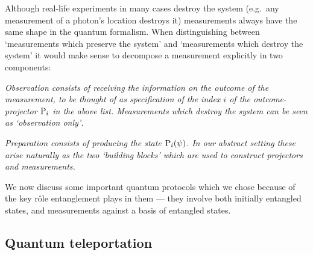 \documentclass[10pt]{article}
\begin{document}
Although real-life experiments in many cases destroy the
system (e.g.~any measurement of a photon's location destroys it) measurements always have the same shape in
the quantum formalism.  When distinguishing between `measurements which preserve the system' and `measurements which
destroy the system' it would make sense to decompose a measurement explicitly in two components:
\bit
\item \em Observation \em consists of receiving the information on the outcome of the measurement, to be thought of
as specification of the index $i$ of the outcome-projector ${\rm P}_i$ in the above list. Measurements which destroy
the system can be seen as `observation only'$\!$. 
\item \em Preparation \em consists of producing the state ${\rm P}_i(\psi)$.
\eit
In our abstract setting these arise naturally as the two `building blocks' which are used to construct
projectors and measurements. 

We now discuss some important quantum protocols which we chose because 
of the key r\^ole entanglement plays in
them --- they involve both initially entangled states, and measurements against a basis of entangled states.

\subsection{Quantum teleportation}
\end{document}
